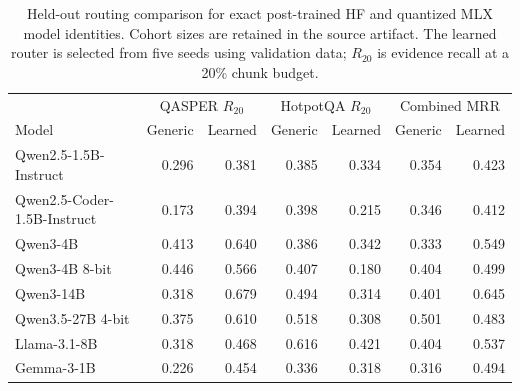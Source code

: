 \begin{table}[t]
\centering
\small
\caption{Held-out routing comparison for exact post-trained HF and quantized MLX model identities. Cohort sizes are retained in the source artifact. The learned router is selected from five seeds using validation data; $R_{20}$ is evidence recall at a 20\% chunk budget.}
\label{tab:hf-catalog-adapters}
\begin{tabular}{lrrrrrr}
\toprule
& \multicolumn{2}{c}{QASPER $R_{20}$} & \multicolumn{2}{c}{HotpotQA $R_{20}$} & \multicolumn{2}{c}{Combined MRR} \\
Model & Generic & Learned & Generic & Learned & Generic & Learned \\
\midrule
Qwen2.5-1.5B-Instruct & 0.296 & 0.381 & 0.385 & 0.334 & 0.354 & 0.423 \\
Qwen2.5-Coder-1.5B-Instruct & 0.173 & 0.394 & 0.398 & 0.215 & 0.346 & 0.412 \\
Qwen3-4B & 0.413 & 0.640 & 0.386 & 0.342 & 0.333 & 0.549 \\
Qwen3-4B 8-bit & 0.446 & 0.566 & 0.407 & 0.180 & 0.404 & 0.499 \\
Qwen3-14B & 0.318 & 0.679 & 0.494 & 0.314 & 0.401 & 0.645 \\
Qwen3.5-27B 4-bit & 0.375 & 0.610 & 0.518 & 0.308 & 0.501 & 0.483 \\
Llama-3.1-8B & 0.318 & 0.468 & 0.616 & 0.421 & 0.404 & 0.537 \\
Gemma-3-1B & 0.226 & 0.454 & 0.336 & 0.318 & 0.316 & 0.494 \\
\bottomrule
\end{tabular}
\end{table}
